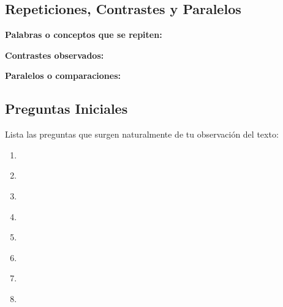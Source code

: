 \documentclass[11pt,a4paper]{article}
\begin{document}
\newpage

\subsection{Repeticiones, Contrastes y Paralelos}

\textbf{Palabras o conceptos que se repiten:}
\vspace{2cm}

\textbf{Contrastes observados:}
\vspace{2cm}

\textbf{Paralelos o comparaciones:}
\vspace{2cm}

\subsection{Preguntas Iniciales}

Lista las preguntas que surgen naturalmente de tu observación del texto:

\begin{enumerate}[leftmargin=1cm]
    \item \underline{\hspace{12cm}}
    \vspace{0.5cm}
    \item \underline{\hspace{12cm}}
    \vspace{0.5cm}
    \item \underline{\hspace{12cm}}
    \vspace{0.5cm}
    \item \underline{\hspace{12cm}}
    \vspace{0.5cm}
    \item \underline{\hspace{12cm}}
    \vspace{0.5cm}
    \item \underline{\hspace{12cm}}
    \vspace{0.5cm}
    \item \underline{\hspace{12cm}}
    \vspace{0.5cm}
    \item \underline{\hspace{12cm}}
    \vspace{0.5cm}
\end{enumerate}
\end{document}
